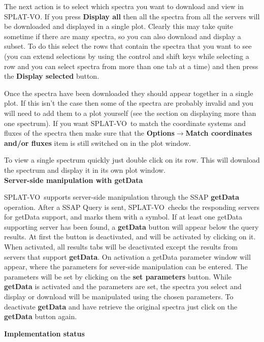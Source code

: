 \documentclass[twoside,11pt]{article}
\newcommand{\htmlref}[2]{#1}
\newcommand{\latexhtml}[2]{#1}
\renewcommand{\_}{\texttt{\symbol{95}}}
\newcommand{\SPLAT}{\textsf{SPLAT-VO}}
\newcommand{\submenuitem}[2]{\latexhtml{\textbf{#1$\rightarrow$#2}}{\textbf{#1->#2}}}
\newcommand{\labelitem}[1]{\textbf{#1}}
\newcommand{\subheading}[1]{\textbf{\large{#1}}}
\begin{document}
The next action is to select which spectra you want to download and view in
\SPLAT. If you press \labelitem{Display all} then all the spectra from all the
servers will be downloaded and displayed in a single plot. Clearly this may
take quite sometime if there are many spectra, so you can also download and
display a subset. To do this select the rows that contain the spectra that
you want to see (you can extend selections by using the control and shift keys
while selecting a row and you can select spectra from more than one tab at a
time) and then press the \labelitem{Display selected} button.

Once the spectra have been downloaded they should appear together in a single
plot. If this isn't the case then some of the spectra are probably invalid and
you will need to add them to a plot yourself (see the section on
\htmlref{displaying more than one spectrum}{displaying_more_than_one_spectrum}).
If you want \SPLAT\ to match the coordinate systems and fluxes of the spectra
then make sure that the
\submenuitem{Options}{Match coordinates and/or fluxes}
item is still switched on in the plot window.

To view a single spectrum quickly just double click on its row. This will
download the spectrum and display it in its own plot window.\\

\subheading{Server-side manipulation with getData}

\SPLAT\ supports server-side manipulation through the SSAP \textbf{getData} operation. After a SSAP Query is sent, \SPLAT\ checks the responding servers for getData support, and marks them with a symbol. If  at least one getData supporting server has been found, a \textbf{getData} button will appear below the query results. At first the button is deactivated, and will be activated by clicking on it. When activated, all results tabs will be deactivated except the results from servers that support \textbf{getData}. On activation a getData parameter window will appear, where the parameters for sever-side manipulation can be entered. The parameters will be set by clicking on the \textbf{set parameters} button. While  \textbf{getData} is activated and the parameters are set, the spectra you select and display or download will be manipulated using the chosen parameters. To deactivate \textbf{getData} and have retrieve the original spectra just click on the \textbf{getData} button again.

\subheading{Implementation status}
\end{document}

